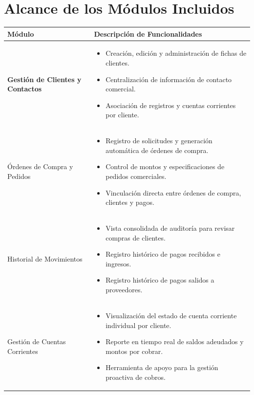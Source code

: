 \documentclass[11pt,letterpaper]{article}
\begin{document}
\section{Alcance de los Módulos Incluidos}

\begin{longtable}{>{\bfseries}p{4.5cm}p{11.0cm}}
\toprule
Módulo & Descripción de Funcionalidades \\
\midrule
\endhead

Gestión de Clientes y Contactos &
\begin{itemize}[leftmargin=1.2em, nosep]
  \item Creación, edición y administración de fichas de clientes.
  \item Centralización de información de contacto comercial.
  \item Asociación de registros y cuentas corrientes por cliente.
\end{itemize} \\
\midrule

Órdenes de Compra y Pedidos &
\begin{itemize}[leftmargin=1.2em, nosep]
  \item Registro de solicitudes y generación automática de órdenes de compra.
  \item Control de montos y especificaciones de pedidos comerciales.
  \item Vinculación directa entre órdenes de compra, clientes y pagos.
\end{itemize} \\
\midrule

Historial de Movimientos &
\begin{itemize}[leftmargin=1.2em, nosep]
  \item Vista consolidada de auditoría para revisar compras de clientes.
  \item Registro histórico de pagos recibidos e ingresos.
  \item Registro histórico de pagos salidos a proveedores.
\end{itemize} \\
\midrule

Gestión de Cuentas Corrientes &
\begin{itemize}[leftmargin=1.2em, nosep]
  \item Visualización del estado de cuenta corriente individual por cliente.
  \item Reporte en tiempo real de saldos adeudados y montos por cobrar.
  \item Herramienta de apoyo para la gestión proactiva de cobros.
\end{itemize} \\
\bottomrule
\end{longtable}
\end{document}
